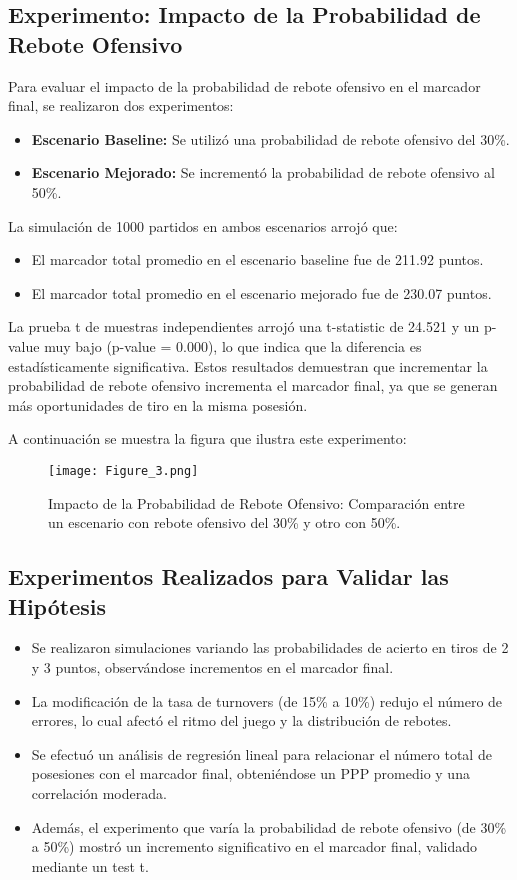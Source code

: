 \documentclass[12pt]{article}
\begin{document}
\subsection{Experimento: Impacto de la Probabilidad de Rebote Ofensivo}
Para evaluar el impacto de la probabilidad de rebote ofensivo en el marcador final, se realizaron dos experimentos:
\begin{itemize}
	\item \textbf{Escenario Baseline:} Se utilizó una probabilidad de rebote ofensivo del 30\%.
	\item \textbf{Escenario Mejorado:} Se incrementó la probabilidad de rebote ofensivo al 50\%.
\end{itemize}
La simulación de 1000 partidos en ambos escenarios arrojó que:
\begin{itemize}
	\item El marcador total promedio en el escenario baseline fue de 211.92 puntos.
	\item El marcador total promedio en el escenario mejorado fue de 230.07 puntos.
\end{itemize}
La prueba t de muestras independientes arrojó una t-statistic de 24.521 y un p-value muy bajo (p-value = 0.000), lo que indica que la diferencia es estadísticamente significativa. Estos resultados demuestran que incrementar la probabilidad de rebote ofensivo incrementa el marcador final, ya que se generan más oportunidades de tiro en la misma posesión.

A continuación se muestra la figura que ilustra este experimento:

\begin{figure}[h]
	\centering
	\texttt{[image: Figure\_3.png]}
	\caption{Impacto de la Probabilidad de Rebote Ofensivo: Comparación entre un escenario con rebote ofensivo del 30\% y otro con 50\%.}
	\label{fig:rebotes}
\end{figure}

\subsection{Experimentos Realizados para Validar las Hipótesis}
\begin{itemize}
	\item Se realizaron simulaciones variando las probabilidades de acierto en tiros de 2 y 3 puntos, observándose incrementos en el marcador final.
	\item La modificación de la tasa de turnovers (de 15\% a 10\%) redujo el número de errores, lo cual afectó el ritmo del juego y la distribución de rebotes.
	\item Se efectuó un análisis de regresión lineal para relacionar el número total de posesiones con el marcador final, obteniéndose un PPP promedio y una correlación moderada.
	\item Además, el experimento que varía la probabilidad de rebote ofensivo (de 30\% a 50\%) mostró un incremento significativo en el marcador final, validado mediante un test t.
\end{itemize}
\end{document}
